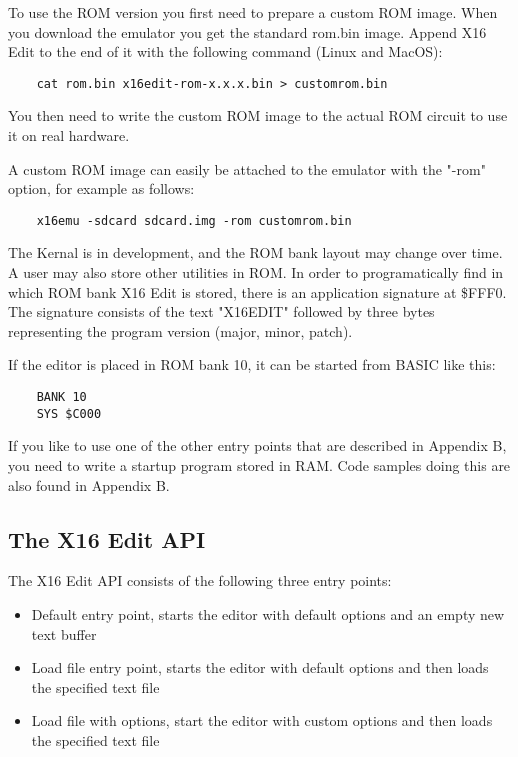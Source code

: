 \documentclass{article}
\begin{document}
        To use the ROM version you first need to prepare a custom ROM image. When you
        download the emulator you get the standard rom.bin image. Append
        X16 Edit to the end of it with the following command (Linux and MacOS):

\begin{verbatim}
    cat rom.bin x16edit-rom-x.x.x.bin > customrom.bin
\end{verbatim}

        You then need to write the custom ROM image to the actual ROM circuit to use it on
        real hardware.

        A custom ROM image can easily be attached to the emulator with
        the "-rom" option, for example as follows:

\begin{verbatim}
    x16emu -sdcard sdcard.img -rom customrom.bin
\end{verbatim}

    The Kernal is in development, and the ROM bank layout may change over time. A user
    may also store other utilities in ROM. In order to programatically find in which
    ROM bank X16 Edit is stored, there is an application signature at \$FFF0. The
    signature consists of the text "X16EDIT" followed by three bytes representing
    the program version (major, minor, patch).
        
    If the editor is placed in ROM bank 10, it can be started from BASIC like this:

\begin{verbatim}
    BANK 10
    SYS $C000
\end{verbatim}

        If you like to use one of the other entry points that are described in Appendix B,
        you need to write a startup program stored in RAM. Code samples doing this
        are also found in Appendix B.

    \subsection{The X16 Edit API}
        The X16 Edit API consists of the following three entry points:

        \begin{itemize}
            \item Default entry point, starts the editor with default options and an empty new text buffer
            \item Load file entry point, starts the editor with default options and then loads the specified text file
            \item Load file with options, start the editor with custom options and then loads the specified text file
        \end{itemize}
\end{document}
